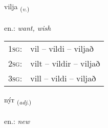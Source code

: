 \documentclass[frontgrid, backgrid]{flacards}\usepackage[]{graphicx}\usepackage[]{xcolor}
\begin{document}
\renewcommand{\blhead}{\vskip5pt {\small\bfseries\footnotesize Sagnorð | Verb }}
\renewcommand{\bcfoot}{\vskip5pt \hspace{2pt}{\small\bfseries\footnotesize 1K}}


{vilja \small{\textsubscript{(\textit{v.})}} \\[1ex] %
\textphonetic{[vɪlja]} \\
en.: \emph{want, wish} \\  [2ex]
\renewcommand*{\arraystretch}{0.8}
\begin{tabular}{p{1cm}l}
\textsc{1sg}: & vil -- vildi -- viljað \\ 
\textsc{2sg}: & vilt -- vildir -- viljað \\ 
\textsc{3sg}: & vill -- vildi -- viljað \\ 
\end{tabular}
}

\renewcommand{\flhead}{\vskip5pt \fboxsep=0pt {\small\bfseries\footnotesize Lýsingarorð | Adjective}}
\renewcommand{\fcfoot}{\vskip5pt \fboxsep=0pt \hspace{2pt}{\small\bfseries\footnotesize 1K}}

\renewcommand{\blhead}{\vskip5pt {\small\bfseries\footnotesize Lýsingarorð | Adjective }}
\renewcommand{\bcfoot}{\vskip5pt \hspace{2pt}{\small\bfseries\footnotesize 1K}}


{nýr \small{\textsubscript{(\textit{adj.})}} \\[1ex] %
\textphonetic{[niːr]} \\
en.: \emph{new} \\  [2ex]
\renewcommand*{\arraystretch}{0.8}
}
\end{document}
